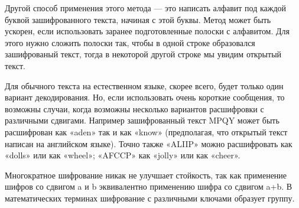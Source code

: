Другой способ применения этого метода — это написать алфавит под каждой буквой зашифрованного текста, начиная с этой буквы. Метод может быть ускорен, если использовать заранее подготовленные полоски с алфавитом. Для этого нужно сложить полоски так, чтобы в одной строке образовался зашифрованый текст, тогда в некоторой другой строке мы увидим открытый текст.

Для обычного текста на естественном языке, скорее всего, будет только один вариант декодирования. Но, если использовать очень короткие сообщения, то возможны случаи, когда возможны несколько вариантов расшифровки с различными сдвигами. Например зашифрованный текст MPQY может быть расшифрован как «aden» так и как «know» (предполагая, что открытый текст написан на английском языке). Точно также «ALIIP» можно расшифровать как «dolls» или как «wheel»; «AFCCP» как «jolly» или как «cheer».

Многократное шифрование никак не улучшает стойкость, так как применение шифров со сдвигом a и b эквивалентно применению шифра со сдвигом a+b. В математических терминах шифрование с различными ключами образует группу.

